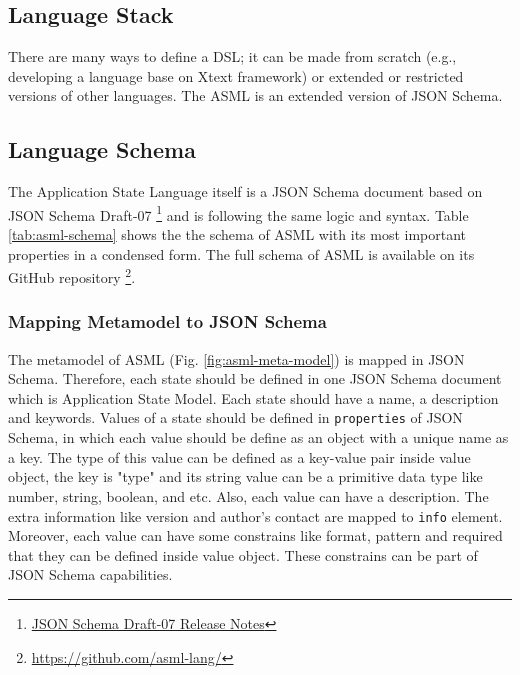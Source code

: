 \subsection{Language Stack}
There are many ways to define a DSL; it can be made from scratch (e.g., developing a language base on Xtext framework) or extended or restricted versions of other languages. The ASML is an extended version of JSON Schema. 

\subsection{Language Schema}
The Application State Language itself is a JSON Schema document based on JSON Schema Draft-07
\footnote{\href{https://json-schema.org/draft-07/json-schema-release-notes.html}{JSON Schema Draft-07 Release Notes}}
and is following the same logic and syntax. Table \ref{tab:asml-schema} shows the the schema of ASML with its most important properties in a condensed form. 
The full schema of ASML is available on its GitHub repository
\footnote{\href{https://github.com/asml-lang/asml/blob/master/schemas/schema.json}{https://github.com/asml-lang/}}.

\subsubsection{Mapping Metamodel to JSON Schema}
The metamodel of ASML (Fig. \ref{fig:asml-meta-model}) is mapped in JSON Schema. Therefore, each state should be defined in one JSON Schema document which is Application State Model. Each state should have a name, a description and keywords. Values of a state should be defined in \lstinline[basicstyle=\ttfamily]{properties} of JSON Schema, in which each value should be define as an object with a unique name as a key. The type of this value can be defined as a key-value pair inside value object, the key is "type" and its string value can be a primitive data type like number, string, boolean, and etc. Also, each value can have a description. The extra information like version and author’s contact are mapped to \lstinline[basicstyle=\ttfamily]{info} element. Moreover, each value can have some constrains like format, pattern and required that they can be defined inside value object. These constrains can be part of JSON Schema capabilities.

